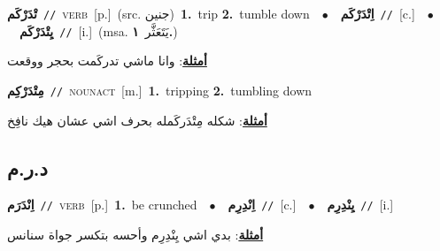\documentclass[10pt,a4paper,twoside]{article} %
\begin{document}
\begin{multicols}{2}
{\setlength\topsep{0pt}\textbf{\foreignlanguage{arabic}{تْدَرْكَم}}\ {\color{gray}\texttt{//}\color{black}}\ \textsc{verb}\ [p.]\ (src. \color{gray}\foreignlanguage{arabic}{جنين}\color{black})\ \textbf{1.}~trip  \textbf{2.}~tumble down\ \ $\bullet$\ \ \setlength\topsep{0pt}\textbf{\foreignlanguage{arabic}{اِتْدَرْكَم}}\ {\color{gray}\texttt{//}\color{black}}\ [c.]\ \ $\bullet$\ \ \setlength\topsep{0pt}\textbf{\foreignlanguage{arabic}{يِتْدَرْكَم}}\ {\color{gray}\texttt{//}\color{black}}\ [i.]\ \color{gray}(msa. \foreignlanguage{arabic}{يَتَعَثَّر}~\foreignlanguage{arabic}{\textbf{١.}})\color{black}\  \begin{flushright}\color{gray}\foreignlanguage{arabic}{\textbf{\underline{\foreignlanguage{arabic}{أمثلة}}}: وانا ماشي تدركَمت بحجر ووقعت}\end{flushright}\color{black}} \vspace{2mm}

{\setlength\topsep{0pt}\textbf{\foreignlanguage{arabic}{مِتْدَرْكِم}}\ {\color{gray}\texttt{//}\color{black}}\ \textsc{noun\textunderscore act}\ [m.]\ \textbf{1.}~tripping  \textbf{2.}~tumbling down\  \begin{flushright}\color{gray}\foreignlanguage{arabic}{\textbf{\underline{\foreignlanguage{arabic}{أمثلة}}}: شكله مِتْدَركَمله بحرف اشي عشان هيك نافِخ}\end{flushright}\color{black}} \vspace{2mm}

\vspace{-3mm}
\subsection*{\color{blue}\foreignlanguage{arabic}{د.ر.م}\color{blue}{}} 

{\setlength\topsep{0pt}\textbf{\foreignlanguage{arabic}{اِنْدَرَم}}\ {\color{gray}\texttt{//}\color{black}}\ \textsc{verb}\ [p.]\ \textbf{1.}~be crunched\ \ $\bullet$\ \ \setlength\topsep{0pt}\textbf{\foreignlanguage{arabic}{اِنْدِرِم}}\ {\color{gray}\texttt{//}\color{black}}\ [c.]\ \ $\bullet$\ \ \setlength\topsep{0pt}\textbf{\foreignlanguage{arabic}{يِنْدِرِم}}\ {\color{gray}\texttt{//}\color{black}}\ [i.]\  \begin{flushright}\color{gray}\foreignlanguage{arabic}{\textbf{\underline{\foreignlanguage{arabic}{أمثلة}}}: بدي اشي يِنْدِرِم وأحسه بتكسر جواة سنانس}\end{flushright}\color{black}} \vspace{2mm}


\end{multicols}
\end{document}
